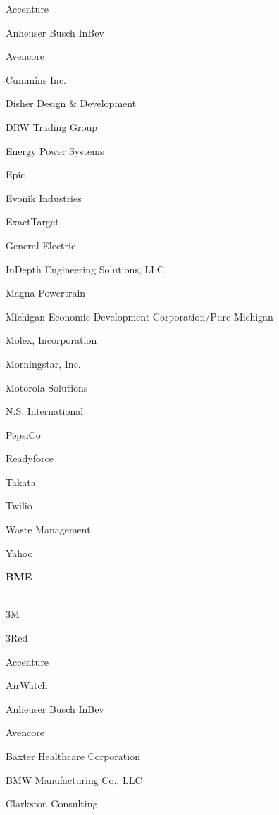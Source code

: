 \documentclass[twoside]{article}
\begin{document}
\begin{center}
\begin{multicols}{5}
\begin{FlushLeft}
\begin{compactitem}
\item Accenture
\item Anheuser Busch InBev
\item Avencore
\item Cummins Inc.
\item Disher Design \& Development
\item DRW Trading Group
\item Energy Power Systems
\item Epic
\item Evonik Industries
\item ExactTarget
\item General Electric
\item InDepth Engineering Solutions, LLC
\item Magna Powertrain
\item Michigan Economic Development Corporation/Pure Michigan
\item Molex, Incorporation
\item Morningstar, Inc.
\item Motorola Solutions
\item N.S. International
\item PepsiCo
\item Readyforce
\item Takata
\item Twilio
\item Waste Management
\item Yahoo
\end{compactitem}
        \end{FlushLeft}
        \vspace{1em}
        {\fontsize{14}{16}\selectfont \bf BME}\\
        \vspace{-1em}
        ~\hrulefill~
        \vspace{-.9em}
        \begin{FlushLeft}
        \begin{compactitem}
        \item 3M
\item 3Red
\item Accenture
\item AirWatch
\item Anheuser Busch InBev
\item Avencore
\item Baxter Healthcare Corporation
\item BMW Manufacturing Co., LLC
\item Clarkston Consulting

\end{compactitem}
\end{FlushLeft}
\end{multicols}
\end{center}
\end{document}
